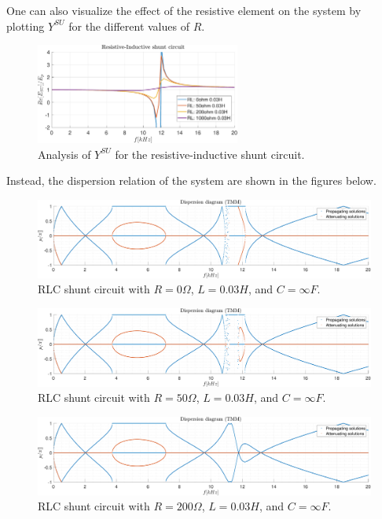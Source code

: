 One can also visualize the effect of the resistive element on the system by plotting $Y^{SU}$ for the different values of $R$.

\begin{figure}[H]
    \centering
    \includegraphics[width=0.6\textwidth]{./img/MATLAB/Y_SU_Resistive-Inductive shunt circuit.pdf}
    \caption{Analysis of $Y^{SU}$ for the resistive-inductive shunt circuit.}
    \label{fig:Y_SU_Resistive-Inductive_shunt_circuit.pdf}
\end{figure}

Instead, the dispersion relation of the system are shown in the figures below.

\begin{figure}[H]
    \centering
    \includegraphics[width=\textwidth]{./img/MATLAB/TMM_ON-ON-ON_RLC_R0_L0.03_CInf.pdf}
    \caption{RLC shunt circuit with $R = 0 \Omega$, $L = 0.03 H$, and $C = \infty F$.}
    \label{fig:TMM_ON-ON-ON_RLC_R0_L0.03_CInf.pdf}
\end{figure}

\begin{figure}[H]
    \centering
    \includegraphics[width=\textwidth]{./img/MATLAB/TMM_ON-ON-ON_RLC_R50_L0.03_CInf.pdf}
    \caption{RLC shunt circuit with $R = 50 \Omega$, $L = 0.03 H$, and $C = \infty F$.}
    \label{fig:TMM_ON-ON-ON_RLC_R50_L0.03_CInf.pdf}
\end{figure}

\begin{figure}[H]
    \centering
    \includegraphics[width=\textwidth]{./img/MATLAB/TMM_ON-ON-ON_RLC_R200_L0.03_CInf.pdf}
    \caption{RLC shunt circuit with $R = 200 \Omega$, $L = 0.03 H$, and $C = \infty F$.}
    \label{fig:TMM_ON-ON-ON_RLC_R200_L0.03_CInf.pdf}
\end{figure}

